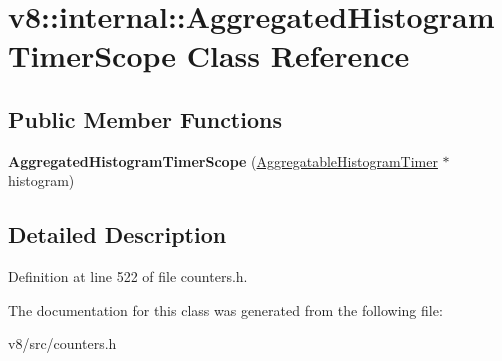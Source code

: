 \hypertarget{classv8_1_1internal_1_1AggregatedHistogramTimerScope}{}\section{v8\+:\+:internal\+:\+:Aggregated\+Histogram\+Timer\+Scope Class Reference}
\label{classv8_1_1internal_1_1AggregatedHistogramTimerScope}
\subsection*{Public Member Functions}
\begin{DoxyCompactItemize}
\item 
\mbox{\label{classv8_1_1internal_1_1AggregatedHistogramTimerScope_abaf836eb7bf83fe4ceeb79a4a5596af0}} 
{\bfseries Aggregated\+Histogram\+Timer\+Scope} (\mbox{\hyperlink{classv8_1_1internal_1_1AggregatableHistogramTimer}{Aggregatable\+Histogram\+Timer}} $\ast$histogram)
\end{DoxyCompactItemize}


\subsection{Detailed Description}


Definition at line 522 of file counters.\+h.



The documentation for this class was generated from the following file\+:\begin{DoxyCompactItemize}
\item 
v8/src/counters.\+h\end{DoxyCompactItemize}
